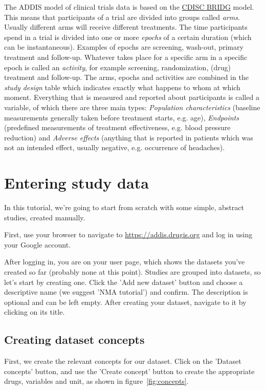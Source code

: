 \documentclass[12pt]{article}
\begin{document}
The ADDIS model of clinical trials data is based on the \href{https://www.cdisc.org/standards/domain-information-module/bridg}{CDISC BRIDG} model.
This means that participants of a trial are divided into groups called \textit{arms}.
Usually different arms will receive different treatments.
The time participants spend in a trial is divided into one or more \textit{epochs} of a certain duration (which can be instantaneous).
Examples of epochs are screening, wash-out, primary treatment and follow-up.
Whatever takes place for a specific arm in a specific epoch is called an \textit{activity}, for example screening, randomization, (drug) treatment and follow-up.
The arms, epochs and activities are combined in the \textit{study design} table which indicates exactly what happens to whom at which moment.
Everything that is measured and reported about participants is called a variable, of which there are three main types: \textit{Population characteristics} (baseline measurements generally taken before treatment starts, e.g. age), \textit{Endpoints} (predefined measurements of treatment effectiveness, e.g. blood pressure reduction) and \textit{Adverse effects} (anything that is reported in patients which was not an intended effect, usually negative, e.g. occurrence of headaches).

\section{Entering study data}

In this tutorial, we're going to start from scratch with some simple, abstract studies, created manually.

First, use your browser to navigate to \href{https://addis.drugis.org}{https://addis.drugis.org} and log in using your Google account.

After logging in, you are on your user page, which shows the datasets you've created so far (probably none at this point).
Studies are grouped into datasets, so let's start by creating one.
Click the 'Add new dataset' button and choose a descriptive name (we suggest 'NMA tutorial') and confirm.
The description is optional and can be left empty.
After creating your dataset, navigate to it by clicking on its title.

\subsection{Creating dataset concepts}

First, we create the relevant concepts for our dataset.
Click on the 'Dataset concepts' button, and use the 'Create concept' button to create the appropriate drugs, variables and unit, as shown in figure~\ref{fig:concepts}.
\end{document}
